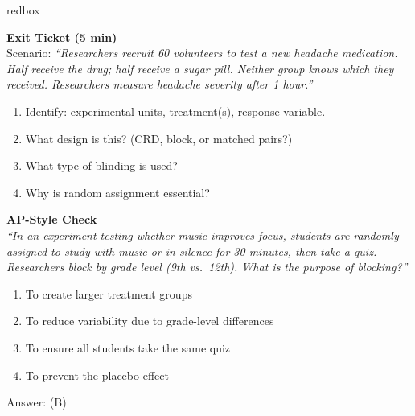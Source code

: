 \documentclass[10pt]{article}
\begin{document}
\begin{skillbox}{redbox}
\begin{minipage}[t]{0.48\linewidth}
    \textbf{Exit Ticket (5 min)}\\
    Scenario: \textit{``Researchers recruit 60 volunteers to test a new headache
    medication. Half receive the drug; half receive a sugar pill. Neither group
    knows which they received. Researchers measure headache severity after 1 hour.''}
    \begin{enumerate}
        \item Identify: experimental units, treatment(s), response variable.
        \item What design is this? (CRD, block, or matched pairs?)
        \item What type of blinding is used?
        \item Why is random assignment essential?
    \end{enumerate}
\end{minipage}
\hfill
\begin{minipage}[t]{0.48\linewidth}
    \textbf{AP-Style Check}\\
    \textit{``In an experiment testing whether music improves focus, students are
    randomly assigned to study with music or in silence for 30 minutes, then take
    a quiz. Researchers block by grade level (9th vs.\ 12th). What is the purpose
    of blocking?''}
    \begin{enumerate}[label=(\Alph*)]
        \item To create larger treatment groups
        \item To reduce variability due to grade-level differences
        \item To ensure all students take the same quiz
        \item To prevent the placebo effect
    \end{enumerate}
    Answer: (B)
\end{minipage}
\end{skillbox}
\end{document}

